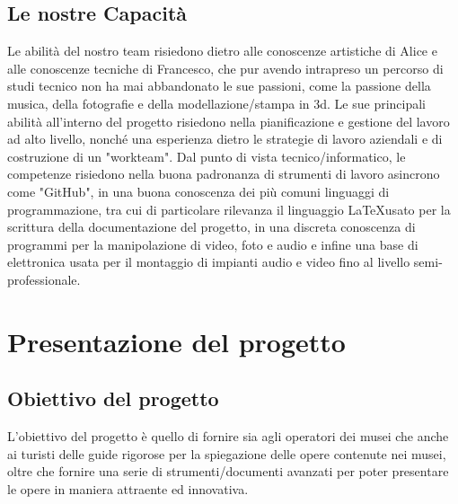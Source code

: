 \documentclass[hidelinks,12pt,a4paper]{article}
\begin{document}
\begin{flushleft}
				\subsection{Le nostre Capacità}
				Le abilità del nostro team risiedono dietro alle conoscenze artistiche di Alice
				e alle conoscenze tecniche di Francesco, che pur avendo intrapreso un percorso di studi tecnico non ha mai abbandonato le sue passioni, come la passione della musica, della fotografie e della modellazione/stampa in 3d. Le sue principali abilità all'interno del progetto risiedono nella pianificazione e gestione del lavoro ad alto livello, nonché una esperienza dietro le strategie di lavoro aziendali e di costruzione di un "workteam". Dal punto di vista tecnico/informatico, le competenze risiedono nella buona padronanza di strumenti di lavoro asincrono come "GitHub", in una buona conoscenza dei più comuni linguaggi di programmazione, tra cui di particolare rilevanza il linguaggio \LaTeX usato per la scrittura della documentazione del progetto, in una discreta conoscenza di programmi per la manipolazione di video, foto e audio e infine una base di elettronica usata per il montaggio di impianti audio e video fino al livello semi-professionale.
			
			\section{Presentazione del progetto}
				\subsection{Obiettivo del progetto}
				L'obiettivo del progetto è quello di fornire sia agli operatori dei musei che anche ai turisti delle guide rigorose per la spiegazione delle opere contenute nei musei, oltre che fornire una serie di strumenti/documenti avanzati per poter presentare le opere in maniera attraente ed innovativa.
				

\end{flushleft}
\end{document}
